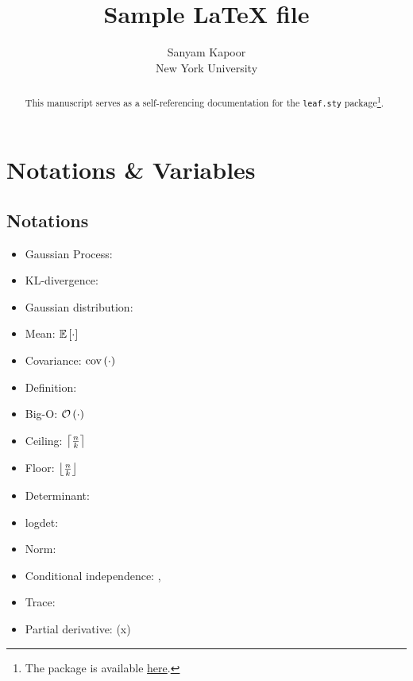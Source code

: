 \documentclass{article}
\begin{document}
\title{Sample \LaTeX{ }file}

\author{\name Sanyam Kapoor \\
        \addr New York University}


\maketitle

\begin{abstract}%
This manuscript serves as a self-referencing documentation for the \texttt{leaf.sty} package\footnote{The package is available \href{https://github.com/activatedgeek/latexfiles}{here}.}.
\end{abstract}


\section{Notations \& Variables}

\subsection{Notations}

\begin{itemize}
\item Gaussian Process: \gp{\cdot,\cdot}
\item KL-divergence: \kl
\item Gaussian distribution: \gaussian{\cdot, \cdot}
\item Mean: $\mathbb{E}\left[\cdot\right]$
\item Covariance: $\mathrm{cov}\left(\cdot\right)$
\item Definition: 
\item Big-O:  $\mathcal{O}\left(\cdot\right)$
\item Ceiling: $\left\lceil \tfrac{n}{k} \right\rceil$
\item Floor: $\left\lfloor \tfrac{n}{k} \right\rfloor$
\item Determinant: \determ{\cdot}
\item logdet: \logdet{\cdot}
\item Norm: \norm{\cdot}
\item Conditional independence: \ci, \nci
\item Trace: \tr{\cdot}
\item Partial derivative: (x)
\end{itemize}
\end{document}
